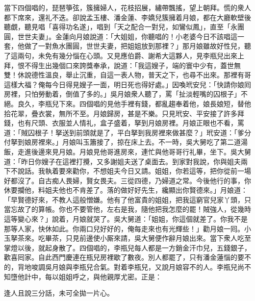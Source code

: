 當下四個唱的，琵琶箏弦，簇擁婦人，花枝招展，繡帶飄搖，望上朝拜。慌的衆人都下席來，還礼不迭。卻說孟玉樓、潘金蓮、李嬌兒簇擁着月娘，都在大廳軟壁後聽覷，聽見唱「喜得功名遂」，唱到「天之配合一對兒，如鸞似鳳」，直至「永團圓，世世夫妻」。金蓮向月娘說道：「大姐姐，你聽唱的！小老婆今日不該唱這一套，{}他做了一對魚水團圓，世世夫妻，把姐姐放到那裡？」{}那月娘雖故好性兒，聽了這兩句，未免有幾分惱在心頭。又見應伯爵、謝希大這夥人，見李瓶兒出來上拜，恨不得生出幾個口來誇獎奉承，說道：「我這嫂子，端的寰中少有，蓋世無雙！休說德性溫良，舉止沉重，自這一表人物，普天之下，也尋不出來。那裡有哥這樣大福？俺每今日得見嫂子一面，明日死也得好處。」{}因喚玳安兒：「快請你娘囘房裡，只怕勞動着，倒值了多的。」吳月娘衆人聽了，罵「扯淡輕嘴的囚根子」不絕。良久，李瓶兒下來。四個唱的見他手裡有錢，都亂趨奉着他，娘長娘短，替他拾花翠，疊衣裳，無所不至。月娘歸房，甚是不樂。只見玳安、平安接了許多拜錢，也有尺頭、衣服並人情礼，盒子盛着，拏到月娘房裡。月娘正眼也不看，罵道：「賊囚根子！拏送到前頭就是了，平白拏到我房裡來做甚麼？」玳安道：「爹分付拏到娘房裡來。」{}月娘叫玉簫接了，掠在床上去。不一時，吳大舅吃了第二道湯飯，走進後邊來見月娘。月娘見他哥進房來，連忙與他哥哥行礼畢，坐下。吳大舅道：「昨日你嫂子在這裡打攪，又多謝姐夫送了桌面去。到家對我說，你與姐夫兩下不說話。我執着要來勸你，不想姐夫今日又請。姐姐，你若這等，把你從前一場好都沒了。自古痴人畏婦，賢女畏夫。三從四德，乃婦道之常。今後他行的事，你休要攔他，料姐夫他也不肯差了。落的做好好先生，纔顯出你賢德來。」{}月娘道：「早賢德好來，不教人這般憎嫌。他有了他富貴的姐姐，把我這窮官兒家丫頭，只當忘故了的算帳。你也不要管他，左右是我，隨他把我怎麼的罷！賊強人，從幾時這等變心來？」說着，月娘就哭了。吳大舅道：「姐姐，你這個就差了。你我不是那等人家，快休如此。你兩口兒好好的，俺每走來也有光輝些！」{}勸月娘一囘。小玉拏茶來。吃畢茶，只見前邊使小厮來請，吳大舅便作辭月娘出來。當下衆人吃至掌燈以後，就起身散了。四個唱的，李瓶兒每人都是一方銷金汗巾兒，五錢銀子，歡喜囘家。自此西門慶連在瓶兒房裡歇了數夜。別人都罷了，只有潘金蓮惱的要不的，背地唆調吳月娘與李瓶兒合氣。對着李瓶兒，又說月娘容不的人。李瓶兒尚不知墮他計中，每以姐姐呼之，與他親厚尤密。正是：

逢人且說三分話，未可全拋一片心。

